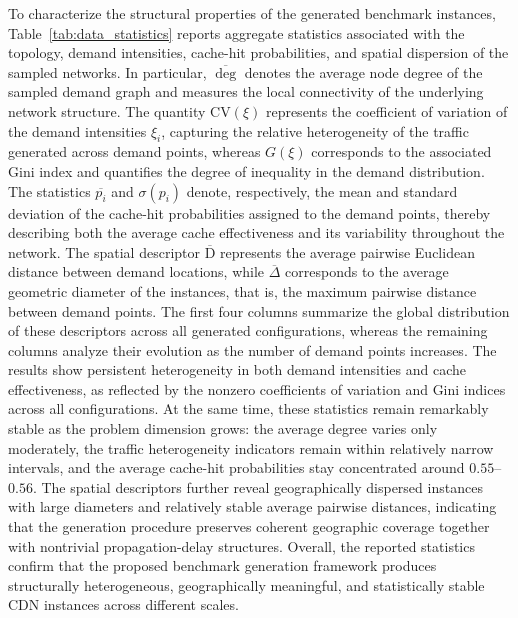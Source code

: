\documentclass[a4paper,11pt,reqno]{amsart}
\newcommand{\D}{\mathrm{D}}
\begin{document}
To characterize the structural properties of the generated benchmark instances, Table~\ref{tab:data_statistics} reports aggregate statistics associated with the topology, demand intensities, cache-hit probabilities, and spatial dispersion of the sampled networks. In particular, $\overline{\deg}$ denotes the average node degree of the sampled demand graph and measures the local connectivity of the underlying network structure. The quantity $\mathrm{CV}(\xi)$ represents the coefficient of variation of the demand intensities $\xi_i$, capturing the relative heterogeneity of the traffic generated across demand points, whereas $G(\xi)$ corresponds to the associated Gini index and quantifies the degree of inequality in the demand distribution. The statistics $\overline{p_i}$ and $\sigma(p_i)$ denote, respectively, the mean and standard deviation of the cache-hit probabilities assigned to the demand points, thereby describing both the average cache effectiveness and its variability throughout the network. The spatial descriptor $\overline{\D}$ represents the average pairwise Euclidean distance between demand locations, while $\overline{\Delta}$ corresponds to the average geometric diameter of the instances, that is, the maximum pairwise distance between demand points. The first four columns summarize the global distribution of these descriptors across all generated configurations, whereas the remaining columns analyze their evolution as the number of demand points increases. The results show persistent heterogeneity in both demand intensities and cache effectiveness, as reflected by the nonzero coefficients of variation and Gini indices across all configurations. At the same time, these statistics remain remarkably stable as the problem dimension grows: the average degree varies only moderately, the traffic heterogeneity indicators remain within relatively narrow intervals, and the average cache-hit probabilities stay concentrated around $0.55$--$0.56$. The spatial descriptors further reveal geographically dispersed instances with large diameters and relatively stable average pairwise distances, indicating that the generation procedure preserves coherent geographic coverage together with nontrivial propagation-delay structures. Overall, the reported statistics confirm that the proposed benchmark generation framework produces structurally heterogeneous, geographically meaningful, and statistically stable CDN instances across different scales.
\end{document}
